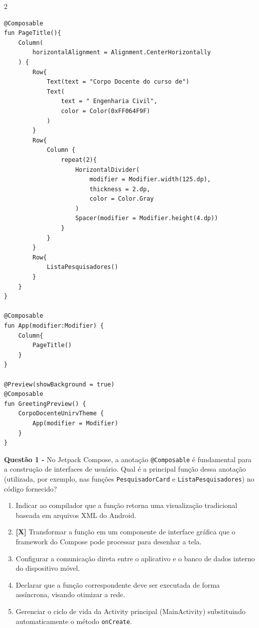 \documentclass[12pt,a4paper]{article}
\begin{document}
\begin{multicols}{2}
\begin{lstlisting}[basicstyle=\scriptsize\ttfamily, breaklines=true]
@Composable
fun PageTitle(){
    Column(
        horizontalAlignment = Alignment.CenterHorizontally
    ) {
        Row{
            Text(text = "Corpo Docente do curso de")
            Text(
                text = " Engenharia Civil",
                color = Color(0xFF064F9F)
            )
        }
        Row{
            Column {
                repeat(2){
                    HorizontalDivider(
                        modifier = Modifier.width(125.dp),
                        thickness = 2.dp,
                        color = Color.Gray
                    )
                    Spacer(modifier = Modifier.height(4.dp))
                }
            }
        }
        Row{
            ListaPesquisadores()
        }
    }
}

@Composable
fun App(modifier:Modifier) {
    Column{
        PageTitle()
    }
}

@Preview(showBackground = true)
@Composable
fun GreetingPreview() {
    CorpoDocenteUnirvTheme {
        App(modifier = Modifier)
    }
}
\end{lstlisting}
\end{multicols}

\vspace{0.5cm}

\textbf{Questão 1 - } No Jetpack Compose, a anotação \texttt{@Composable} é fundamental para a construção de interfaces de usuário. Qual é a principal função dessa anotação (utilizada, por exemplo, nas funções \texttt{PesquisadorCard} e \texttt{ListaPesquisadores}) no código fornecido?

\begin{enumerate}[label=\alph*)]
    \item Indicar ao compilador que a função retorna uma visualização tradicional baseada em arquivos XML do Android.
    \item \textbf{[X]} Transformar a função em um componente de interface gráfica que o framework do Compose pode processar para desenhar a tela.
    \item Configurar a comunicação direta entre o aplicativo e o banco de dados interno do dispositivo móvel.
    \item Declarar que a função correspondente deve ser executada de forma assíncrona, visando otimizar a rede.
    \item Gerenciar o ciclo de vida da Activity principal (MainActivity) substituindo automaticamente o método \texttt{onCreate}.
\end{enumerate}
\end{document}
